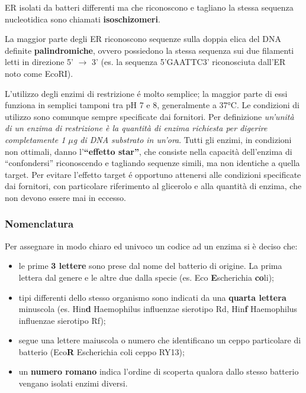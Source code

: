 \documentclass[]{article}
\begin{document}
ER isolati da batteri differenti ma che riconoscono e tagliano la stessa
sequenza nucleotidica sono chiamati \textbf{isoschizomeri}.

La maggior parte degli ER riconoscono sequenze sulla doppia elica del
DNA definite \textbf{palindromiche}, ovvero possiedono la stessa
sequenza sui due filamenti letti in direzione 5' \(\rightarrow\) 3' (es.
la sequenza 5'GAATTC3' riconosciuta dall'ER noto come EcoRI).

L'utilizzo degli enzimi di restrizione é molto semplice; la maggior
parte di essi funziona in semplici tamponi tra pH 7 e 8, generalmente a
37°C. Le condizioni di utilizzo sono comunque sempre specificate dai
fornitori. Per definizione \emph{un'unità di un enzima di restrizione è
la quantità di enzima richiesta per digerire completamente 1 \(\mu\)g di
DNA substrato in un'ora}. Tutti gli enzimi, in condizioni non ottimali,
danno l'\textbf{``effetto star''}, che consiste nella capacità
dell'enzima di ``confondersi'' riconoscendo e tagliando sequenze simili,
ma non identiche a quella target. Per evitare l'effetto target é
opportuno attenersi alle condizioni specificate dai fornitori, con
particolare riferimento al glicerolo e alla quantità di enzima, che non
devono essere mai in eccesso.

\subsubsection{Nomenclatura}\label{nomenclatura}

Per assegnare in modo chiaro ed univoco un codice ad un enzima si è
deciso che:

\begin{itemize}
\itemsep1pt\parskip0pt
\item
  le prime \textbf{3 lettere} sono prese dal nome del batterio di
  origine. La prima lettera dal genere e le altre due dalla specie (es.
  Eco \textbf{E}scherichia \textbf{co}li);
\item
  tipi differenti dello stesso organismo sono indicati da una
  \textbf{quarta lettera} minuscola (es. Hin\textbf{d} Haemophilus
  influenzae sierotipo Rd, Hin\textbf{f} Haemophilus influenzae
  sierotipo Rf);
\item
  segue una lettere maiuscola o numero che identificano un ceppo
  particolare di batterio (Eco\textbf{R} Escherichia coli ceppo RY13);
\item
  un \textbf{numero romano} indica l'ordine di scoperta qualora dallo
  stesso batterio vengano isolati enzimi diversi.
\end{itemize}
\end{document}
